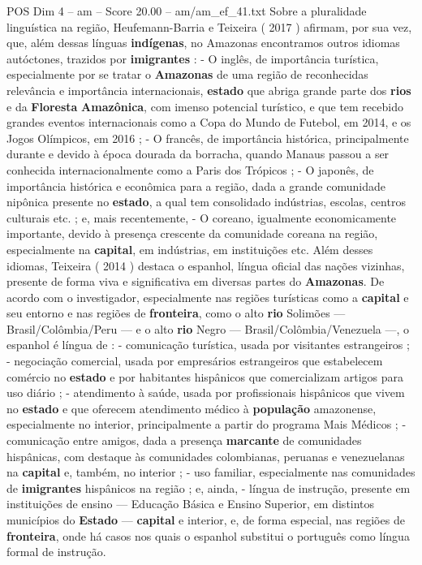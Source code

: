 \begin{textsample}{POS Dim 4 – am – Score 20.00 – am/am\_ef\_41.txt}
Sobre a pluralidade linguística na região, Heufemann-Barria e Teixeira ( 2017 ) afirmam, por sua vez, que, além dessas línguas \textbf{indígenas}, no Amazonas encontramos outros idiomas autóctones, trazidos por \textbf{imigrantes} : - O inglês, de importância turística, especialmente por se tratar o \textbf{Amazonas} de uma região de reconhecidas relevância e importância internacionais, \textbf{estado} que abriga grande parte dos \textbf{rios} e da \textbf{Floresta} \textbf{Amazônica}, com imenso potencial turístico, e que tem recebido grandes eventos internacionais como a Copa do Mundo de Futebol, em 2014, e os Jogos Olímpicos, em 2016 ; - O francês, de importância histórica, principalmente durante e devido à época dourada da borracha, quando Manaus passou a ser conhecida internacionalmente como a Paris dos Trópicos ; - O japonês, de importância histórica e econômica para a região, dada a grande comunidade nipônica presente no \textbf{estado}, a qual tem consolidado indústrias, escolas, centros culturais etc. ; e, mais recentemente, - O coreano, igualmente economicamente importante, devido à presença crescente da comunidade coreana na região, especialmente na \textbf{capital}, em indústrias, em instituições etc.
Além desses idiomas, Teixeira ( 2014 ) destaca o espanhol, língua oficial das nações vizinhas, presente de forma viva e significativa em diversas partes do \textbf{Amazonas}.
De acordo com o investigador, especialmente nas regiões turísticas como a \textbf{capital} e seu entorno e nas regiões de \textbf{fronteira}, como o alto \textbf{rio} Solimões — Brasil/Colômbia/Peru — e o alto \textbf{rio} Negro — Brasil/Colômbia/Venezuela —, o espanhol é língua de : - comunicação turística, usada por visitantes estrangeiros ; - negociação comercial, usada por empresários estrangeiros que estabelecem comércio no \textbf{estado} e por habitantes hispânicos que comercializam artigos para uso diário ; - atendimento à saúde, usada por profissionais hispânicos que vivem no \textbf{estado} e que oferecem atendimento médico à \textbf{população} amazonense, especialmente no interior, principalmente a partir do programa Mais Médicos ; - comunicação entre amigos, dada a presença \textbf{marcante} de comunidades hispânicas, com destaque às comunidades colombianas, peruanas e venezuelanas na \textbf{capital} e, também, no interior ; - uso familiar, especialmente nas comunidades de \textbf{imigrantes} hispânicos na região ; e, ainda, - língua de instrução, presente em instituições de ensino — Educação Básica e Ensino Superior, em distintos municípios do \textbf{Estado} — \textbf{capital} e interior, e, de forma especial, nas regiões de \textbf{fronteira}, onde há casos nos quais o espanhol substitui o português como língua formal de instrução.

\end{textsample}

